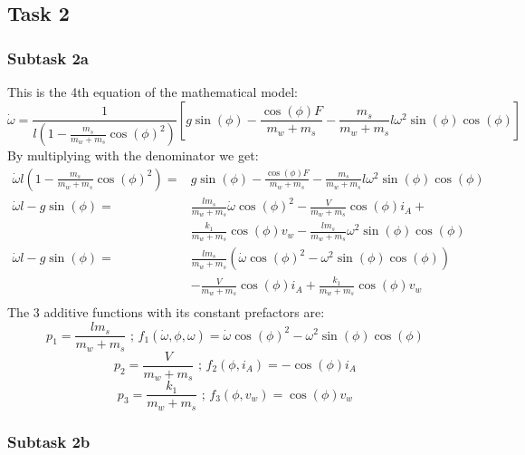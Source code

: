\documentclass[a4paper, 12pt]{scrartcl}
\begin{document}
\subsection{Task 2}
\subsubsection{Subtask 2a}
This is the 4th equation of the mathematical model:
\begin{equation}
	\dot{\omega} = \frac{1}{l\left(1-\frac{m_s}{m_w + m_s} \cos(\phi)^2\right)} \left[ g \sin(\phi) -  \frac{\cos(\phi)F}{m_w + m_s} - \frac{m_s}{m_w + m_s} {l \omega^2} \sin(\phi) \cos(\phi) \right]
\end{equation}
By multiplying with the denominator we get: 
\begin{equation}
	\begin{split}
		\dot{\omega}l \left(1-\frac{m_s}{m_w + m_s} \cos(\phi)^2\right) = & g \sin(\phi) -  \frac{\cos(\phi)F}{m_w + m_s} - \frac{m_s}{m_w + m_s} {l \omega^2} \sin(\phi) \cos(\phi) \\
		\dot{\omega}l - g \sin(\phi) = & \frac{l m_s}{m_w + m_s} \dot{\omega} \cos(\phi)^2 - \frac{V}{m_w + m_s} \cos(\phi) i_A + \\
		& \frac{k_1}{m_w + m_s} \cos(\phi) v_w - \frac{l m_s}{m_w + m_s} \omega^2 \sin(\phi) \cos(\phi) \\
		\dot{\omega}l - g \sin(\phi) = & \frac{l m_s}{m_w + m_s} \left( \dot{\omega} \cos(\phi)^2 - \omega^2 \sin(\phi) \cos(\phi) \right) \\ 
		& - \frac{V}{m_w + m_s} \cos(\phi) i_A + \frac{k_1}{m_w + m_s} \cos(\phi) v_w \\
	\end{split}
\end{equation}
The 3 additive functions with its constant prefactors are: 
\begin{equation}
	p_1 = \frac{l m_s}{m_w + m_s} \text{ ; } f_1(\dot{\omega}, \phi, \omega) = \dot{\omega} \cos(\phi)^2 - \omega^2 \sin(\phi) \cos(\phi)
\end{equation}
\begin{equation}
	p_2 = \frac{V}{m_w + m_s}  \text{ ; } f_2(\phi, i_A) = -\cos(\phi) i_A
\end{equation}
\begin{equation}
	p_3 = \frac{k_1}{m_w + m_s} \text{ ; } f_3(\phi, v_w) = \cos(\phi) v_w
\end{equation}

\subsubsection{Subtask 2b}
\end{document}
